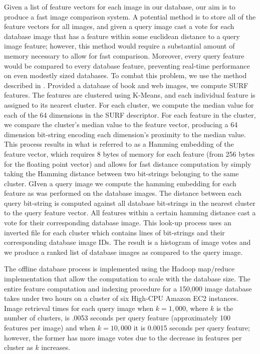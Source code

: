 \documentclass{www2010-submission}
\begin{document}
Given a list of feature vectors for each image in our database, our
aim is to produce a fast image comparison system.  A potential method
is to store all of the feature vectors for all images, and given a
query image cast a vote for each database image that has a feature
within some euclidean distance to a query image feature; however, this
method would require a substantial amount of memory necessary to allow
for fast comparison.  Moreover, every query feature would be compared
to every database feature, preventing real-time performance on even
modestly sized databases.  To combat this problem, we use the method
described in \cite{Schmid1478419}.  Provided a database of book and web
images, we compute SURF features. The features are clustered using
K-Means, and each individual feature is assigned to its nearest
cluster.  For each cluster, we compute the median value for each of
the 64 dimensions in the SURF descriptor.  For each feature in the
cluster, we compare the cluster's median value to the feature vector,
producing a 64 dimension bit-string encoding each dimension's
proximity to the median value.  This process results in what is
referred to as a Hamming embedding of the feature vector, which
requires 8 bytes of memory for each feature (from 256 bytes for the floating point vector) and allows for fast
distance computation by simply taking the Hamming distance between two
bit-strings belonging to the same cluster.  GIven a query image we
compute the hamming embedding for each feature as was performed on the
database images.  The distance between each query bit-string is
computed against all database bit-strings in the nearest cluster to
the query feature vector.  All features within a certain hamming
distance cast a vote for their corresponding database image.  This
look-up process uses an inverted file for each cluster which contains
lines of bit-strings and their corresponding database image IDs.  The
result is a histogram of image votes and we produce a ranked list of
database images as compared to the query image.

The offline database process is implemented using the Hadoop map/reduce \cite{Ghemaqat1327492} implementation that allow the computation to scale with the database size.  The entire feature computation and indexing procedure for a 150,000 image database takes under two hours on a cluster of six High-CPU Amazon EC2 instances.  Image retrieval times for each query image when $k=1,000$, where $k$ is the number of clusters, is .0053 seconds per query feature (approximately 100 features per image) and when $k=10,000$ it is 0.0015 seconds per query feature; however, the former has more image votes due to the decrease in features per cluster as $k$ increases.
\end{document}
